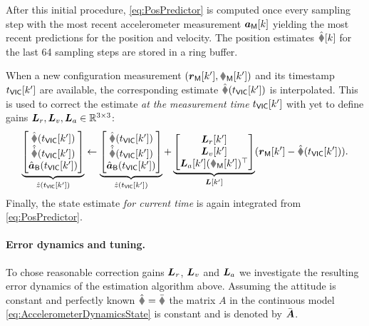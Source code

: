 After this initial procedure, \eqref{eq:PosPredictor} is computed once every sampling step with the most recent accelerometer measurement $\boldsymbol{a}_{\mathsf{M}}[k]$ yielding the most recent predictions for the position and velocity.
The position estimates $\rObs[k]$ for the last 64 sampling steps are stored in a ring buffer.

When a new configuration measurement $(\rVIC[k'], \RVIC[k'])$ and its timestamp $t_{\mathsf{VIC}}[k']$ are available, the corresponding estimate $\rObs(\tVIC[k'])$ is interpolated.
This is used to correct the estimate \textit{at the measurement time} $t_{\mathsf{VIC}}[k']$ with yet to define gains $\boldsymbol{L}_r, \boldsymbol{L}_v, \boldsymbol{L}_a \in \mathbb{R}^{3\times3}$:
\begin{align}\label{eq:PosCorrector}
 \underbrace{\begin{bmatrix} \rObs(\tVIC[k']) \\ \rdObs(\tVIC[k']) \\ \aIMUBObs(\tVIC[k']) \end{bmatrix}}_{\hat{z}(\tVIC[k'])}
 \leftarrow 
 \underbrace{\begin{bmatrix} \rObs(\tVIC[k']) \\ \rdObs(\tVIC[k']) \\ \aIMUBObs(\tVIC[k']) \end{bmatrix}}_{\hat{z}(\tVIC[k'])}
 +
 \underbrace{\begin{bmatrix} \mat{L}_r[k'] \\ \mat{L}_v[k'] \\ \mat{L}_a[k'] (\RVIC[k'])^\top \end{bmatrix}}_{\mat{L}[k']}
 (\rVIC[k'] - \rObs(\tVIC[k'])).
\end{align}
Finally, the state estimate \textit{for current time} is again integrated from \eqref{eq:PosPredictor}.


\paragraph{Error dynamics and tuning.}
To chose reasonable correction gains $\boldsymbol{L}_r$, $\boldsymbol{L}_v$ and $\boldsymbol{L}_a$ we investigate the resulting error dynamics of the estimation algorithm above.
Assuming the attitude is constant and perfectly known $\RObs = \bar{\R}$ the matrix $A$ in the continuous model \eqref{eq:AccelerometerDynamicsState} is constant and is denoted by $\bar{\boldsymbol{A}}$.

